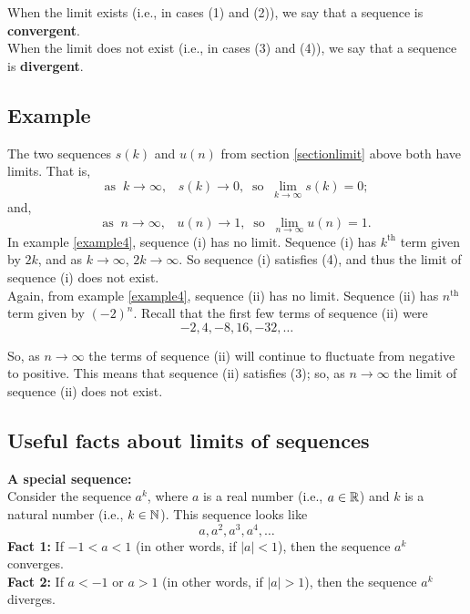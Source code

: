\noindent When the limit exists (i.e., in cases (1) and (2)), we say that a sequence is \textbf{convergent}. \\ When the limit does not exist (i.e., in cases (3) and (4)), we say that a sequence is \textbf{divergent}. \label{convergent} \label{divergent}


\subsection{Example}
The two sequences $s(k)$ and $u(n)$ from section \ref{sectionlimit} above both have limits. That is,
\[
\text{as} \;\; k \rightarrow \infty, \;\;\; s(k) \rightarrow 0, \;\; \text{so} \;\; \lim_{k \rightarrow \infty}s(k) = 0;
\]
and,
\[
\text{as} \;\; n \rightarrow \infty, \;\;\; u(n) \rightarrow 1, \;\; \text{so} \;\; \lim_{n \rightarrow \infty}u(n) = 1.
\]
In example \ref{example4}, sequence (i) has no limit. Sequence (i) has $k^{\text{th}}$ term given by $2k$, and as $k \rightarrow \infty$, $2k \rightarrow \infty$. So sequence (i) satisfies (4), and thus the limit of sequence (i) does not exist. \\

\noindent Again, from example \ref{example4}, sequence (ii) has no limit. Sequence (ii) has $n^{\text{th}}$ term given by $(-2)^n.$ Recall that the first few terms of sequence (ii) were
\[
-2,4,-8,16,-32,\ldots
\]

\noindent So, as $n \rightarrow \infty$ the terms of sequence (ii) will continue to fluctuate from negative to positive. This means that sequence (ii) satisfies (3); so, as $n  \rightarrow \infty$ the limit of sequence (ii) does not exist.

\subsection{Useful facts about limits of sequences} \label{limitfacts}
\vspace{0.5cm}
\textbf{A special sequence:} \\
Consider the sequence $a^k$, where $a$ is a real number (i.e., $a \in \mathbb{R}$) and $k$ is a natural number (i.e., $k \in \mathbb{N}$). This sequence looks like
\[
a, a^2, a^3, a^4, \ldots
\]
\textbf{Fact 1:} If $-1 < a < 1$ (in other words, if $|a| < 1$), then the sequence $a^k$ converges. \\
\textbf{Fact 2:} If $a < -1$ or $a > 1$ (in other words, if $|a| > 1$), then the sequence $a^k$ diverges. \\

